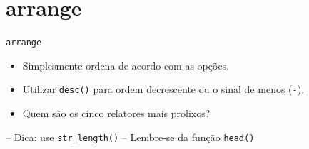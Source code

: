 \documentclass[
  10pt,
  ignorenonframetext,
]{beamer}
\providecommand{\tightlist}{%
  \setlength{\itemsep}{0pt}\setlength{\parskip}{0pt}}
\begin{document}
\hypertarget{arrange}{%
\section{arrange}\label{arrange}}

\begin{frame}[fragile]{\texttt{arrange}}
\protect\hypertarget{arrange-1}{}
\begin{itemize}
\item
  Simplesmente ordena de acordo com as opções.
\item
  Utilizar \texttt{desc()} para ordem decrescente ou o sinal de menos
  (\texttt{-}).
\end{itemize}
\end{frame}

\begin{frame}[fragile]{}
\protect\hypertarget{section-3}{}
\begin{itemize}
\tightlist
\item
  Quem são os cinco relatores mais prolixos?
\end{itemize}

-- Dica: use \texttt{str\_length()} -- Lembre-se da função
\texttt{head()}
\end{frame}
\end{document}

